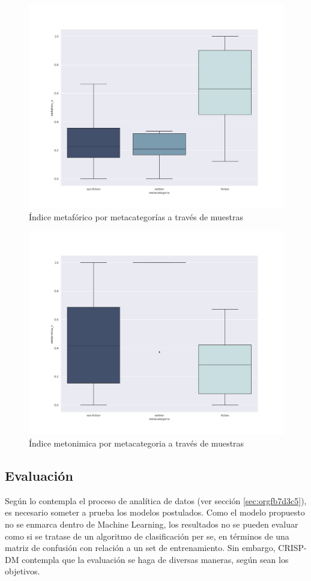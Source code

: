 \documentclass[12pt,letterpaper,twoside]{article}
\begin{document}
\begin{figure}[H]
\centering
\includegraphics[width=0.9\linewidth]{./resultados/graphs/total/metafora_total.png}
\caption{\label{fig:metafora_total} Índice metafórico por metacategorías a través de muestras }
\end{figure}

\begin{figure}[H]
\centering
\includegraphics[width=0.9\linewidth]{./resultados/graphs/total/metonimia_total.png}
\caption{\label{fig:metonimia_total} Índice metonimica por metacategoria a través de muestras }
\end{figure}

\subsection{Evaluación}
\label{sec:org4d167b8}
Según lo contempla el proceso de analítica de datos (ver sección
\ref{sec:orgfb7d3c5}), es necesario someter a prueba los modelos
postulados.  Como el modelo propuesto no se enmarca dentro de
Machine Learning, los resultados no se pueden evaluar como si se
tratase de un algoritmo de clasificación per se, en términos de una
matriz de confusión con relación a un set de entrenamiento. Sin
embargo, CRISP-DM contempla que la evaluación se haga de diversas
maneras, según sean los objetivos.
\end{document}

